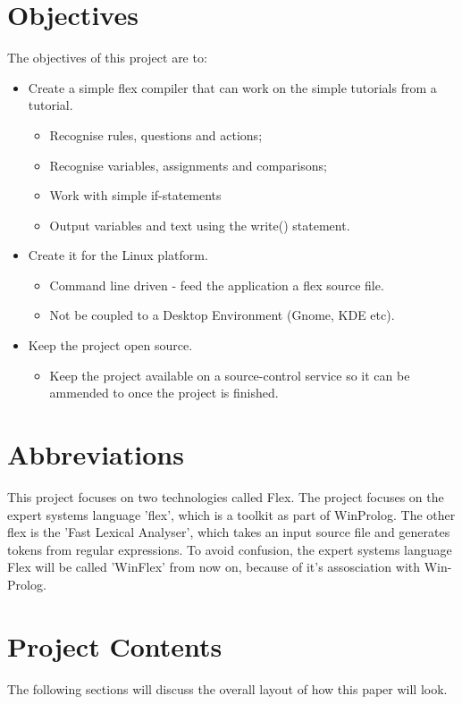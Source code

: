 \documentclass[12pt]{report}
\begin{document}
\section{Objectives}\label{sec:objectives}
The objectives of this project are to:
\begin{itemize}
\item Create a simple flex compiler that can work on the simple tutorials from a tutorial.
	\begin{itemize}
	\item Recognise rules, questions and actions;
	\item Recognise variables, assignments and comparisons;
	\item Work with simple if-statements
	\item Output variables and text using the write() statement.
	\end{itemize}
\item Create it for the Linux platform.
	\begin{itemize}
	\item Command line driven - feed the application a flex source file.
	\item Not be coupled to a Desktop Environment (Gnome, KDE etc).
	\end{itemize}
\item Keep the project open source.
	\begin{itemize}
	\item Keep the project available on a source-control service so it can be ammended to once the project is finished.
	\end{itemize}
\end{itemize}
\clearpage
\section{Abbreviations}\label{sec:abbreviations}
This project focuses on two technologies called Flex.  The project focuses on the expert systems language 'flex', which is a toolkit as part of WinProlog.  The other flex is the 'Fast Lexical Analyser', which takes an input source file and generates tokens from regular expressions.  To avoid confusion, the expert systems language Flex will be called 'WinFlex' from now on, because of it's assosciation with Win-Prolog.
\section{Project Contents}\label{sec:project_contents}
The following sections will discuss the overall layout of how this paper will look.
\end{document}

